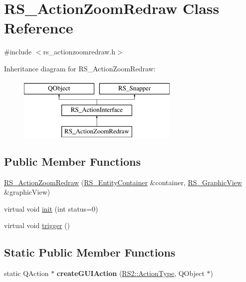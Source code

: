 \hypertarget{classRS__ActionZoomRedraw}{\section{R\-S\-\_\-\-Action\-Zoom\-Redraw Class Reference}
\label{classRS__ActionZoomRedraw}
}


{\ttfamily \#include $<$rs\-\_\-actionzoomredraw.\-h$>$}

Inheritance diagram for R\-S\-\_\-\-Action\-Zoom\-Redraw\-:\begin{figure}[H]
\begin{center}
\leavevmode
\includegraphics[height=3.000000cm]{classRS__ActionZoomRedraw}
\end{center}
\end{figure}
\subsection*{Public Member Functions}
\begin{DoxyCompactItemize}
\item 
\hyperlink{classRS__ActionZoomRedraw_a9fb9032603111b877a53bde51eba7b43}{R\-S\-\_\-\-Action\-Zoom\-Redraw} (\hyperlink{classRS__EntityContainer}{R\-S\-\_\-\-Entity\-Container} \&container, \hyperlink{classRS__GraphicView}{R\-S\-\_\-\-Graphic\-View} \&graphic\-View)
\item 
virtual void \hyperlink{classRS__ActionZoomRedraw_a33c45dd6fe16b61b4a8119ef8da6637a}{init} (int status=0)
\item 
virtual void \hyperlink{classRS__ActionZoomRedraw_a591c6dea729a8792bdf4064716d727a5}{trigger} ()
\end{DoxyCompactItemize}
\subsection*{Static Public Member Functions}
\begin{DoxyCompactItemize}
\item 
\hypertarget{classRS__ActionZoomRedraw_a948e5164d0eb3621fcfd792d835d9a8c}{static Q\-Action $\ast$ {\bfseries create\-G\-U\-I\-Action} (\hyperlink{classRS2_afe3523e0bc41fd637b892321cfc4b9d7}{R\-S2\-::\-Action\-Type}, Q\-Object $\ast$)}\label{classRS__ActionZoomRedraw_a948e5164d0eb3621fcfd792d835d9a8c}

\end{DoxyCompactItemize}
